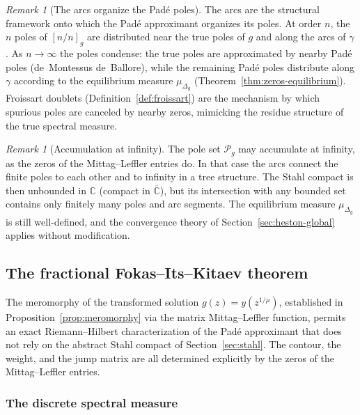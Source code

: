 \documentclass[11pt]{article}
\theoremstyle{definition}
\theoremstyle{remark}
\newtheorem{remark}[theorem]{Remark}
\begin{document}
\begin{remark}[The arcs organize the Pad\'e poles]
\label{rem:arcs-organize-poles}
The arcs are the structural framework onto which the Pad\'e approximant organizes its poles. At order $n$, the $n$ poles of $[n/n]_{g}$ are distributed near the true poles of $g$ and along the arcs of $\gamma$. As $n\to\infty$ the poles condense: the true poles are approximated by nearby Pad\'e poles (de~Montessus de~Ballore), while the remaining Pad\'e poles distribute along $\gamma$ according to the equilibrium measure $\mu_{\Delta_{g}}$ (Theorem~\ref{thm:zeros-equilibrium}). Froissart doublets (Definition~\ref{def:froissart}) are the mechanism by which spurious poles are canceled by nearby zeros, mimicking the residue structure of the true spectral measure.
\end{remark}

\begin{remark}[Accumulation at infinity]
\label{rem:accumulation-infinity}
The pole set $\mathcal{P}_{g}$ may accumulate at infinity, as the zeros of the Mittag--Leffler entries do. In that case the arcs connect the finite poles to each other and to infinity in a tree structure. The Stahl compact is then unbounded in $\mathbb{C}$ (compact in $\overline{\mathbb{C}}$), but its intersection with any bounded set contains only finitely many poles and arc segments. The equilibrium measure $\mu_{\Delta_{g}}$ is still well-defined, and the convergence theory of Section~\ref{sec:heston-global} applies without modification.
\end{remark}

\subsection{The fractional Fokas--Its--Kitaev theorem}
\label{sec:heston-fik}

The meromorphy of the transformed solution $g(z)=y(z^{1/\mu})$, established in Proposition~\ref{prop:meromorphy} via the matrix Mittag--Leffler function, permits an exact Riemann--Hilbert characterization of the Pad\'e approximant that does not rely on the abstract Stahl compact of Section~\ref{sec:stahl}. The contour, the weight, and the jump matrix are all determined explicitly by the zeros of the Mittag--Leffler entries.

\subsubsection{The discrete spectral measure}
\label{sec:ml-spectral-measure}
\end{document}
